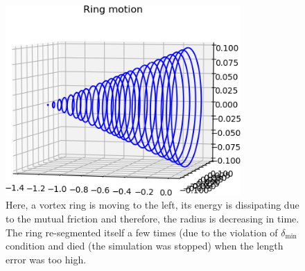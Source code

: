 \begin{figure}[h]
	\centering
	\includegraphics[width=0.8\textwidth]{graphics/results/ring-motion_full}
	\caption{Here, a vortex ring is moving to the left, its energy is dissipating due to the mutual friction and therefore, the radius is decreasing in time. The ring re-segmented itself a few times (due to the violation of $\delta_{\text{min}}$ condition and died (the simulation was stopped) when the length error was too high.}
\end{figure}

\newpage
